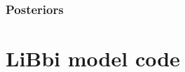 \documentclass{ruthesis}
\begin{document}
\FloatBarrier
\subsection{Posteriors}




%
%
%
%
%
%



\appendix

\chapter{LiBbi model code}\label{appendix_micro_libbi_code}
\end{document}
